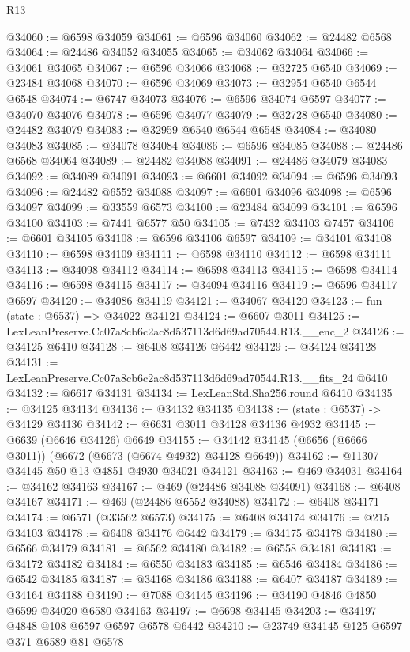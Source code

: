 \begin{lexlean}{R13}
\begin{coremodule}
@34060 := @6598 @34059
@34061 := @6596 @34060
@34062 := @24482 @6568
@34064 := @24486 @34052 @34055
@34065 := @34062 @34064
@34066 := @34061 @34065
@34067 := @6596 @34066
@34068 := @32725 @6540
@34069 := @23484 @34068
@34070 := @6596 @34069
@34073 := @32954 @6540 @6544 @6548
@34074 := @6747 @34073
@34076 := @6596 @34074 @6597
@34077 := @34070 @34076
@34078 := @6596 @34077
@34079 := @32728 @6540
@34080 := @24482 @34079
@34083 := @32959 @6540 @6544 @6548
@34084 := @34080 @34083
@34085 := @34078 @34084
@34086 := @6596 @34085
@34088 := @24486 @6568 @34064
@34089 := @24482 @34088
@34091 := @24486 @34079 @34083
@34092 := @34089 @34091
@34093 := @6601 @34092
@34094 := @6596 @34093
@34096 := @24482 @6552 @34088
@34097 := @6601 @34096
@34098 := @6596 @34097
@34099 := @33559 @6573
@34100 := @23484 @34099
@34101 := @6596 @34100
@34103 := @7441 @6577 @50
@34105 := @7432 @34103 @7457
@34106 := @6601 @34105
@34108 := @6596 @34106 @6597
@34109 := @34101 @34108
@34110 := @6598 @34109
@34111 := @6598 @34110
@34112 := @6598 @34111
@34113 := @34098 @34112
@34114 := @6598 @34113
@34115 := @6598 @34114
@34116 := @6598 @34115
@34117 := @34094 @34116
@34119 := @6596 @34117 @6597
@34120 := @34086 @34119
@34121 := @34067 @34120
@34123 := fun (state : @6537) => @34022 @34121
@34124 := @6607 @3011
@34125 := LexLeanPreserve.Cc07a8cb6c2ac8d537113d6d69ad70544.R13.__enc_2
@34126 := @34125 @6410
@34128 := @6408 @34126 @6442
@34129 := @34124 @34128
@34131 := LexLeanPreserve.Cc07a8cb6c2ac8d537113d6d69ad70544.R13.__fits_24 @6410
@34132 := @6617 @34131
@34134 := LexLeanStd.Sha256.round @6410
@34135 := @34125 @34134
@34136 := @34132 @34135
@34138 := (state : @6537) -> @34129 @34136
@34142 := @6631 @3011 @34128 @34136 @4932
@34145 := @6639 (@6646 @34126) @6649
@34155 := @34142 @34145 (@6656 (@6666 @3011)) (@6672 (@6673 (@6674 @4932) @34128 @6649))
@34162 := @11307 @34145 @50 @13 @4851 @4930 @34021 @34121
@34163 := @469 @34031
@34164 := @34162 @34163
@34167 := @469 (@24486 @34088 @34091)
@34168 := @6408 @34167
@34171 := @469 (@24486 @6552 @34088)
@34172 := @6408 @34171
@34174 := @6571 (@33562 @6573)
@34175 := @6408 @34174
@34176 := @215 @34103
@34178 := @6408 @34176 @6442
@34179 := @34175 @34178
@34180 := @6566 @34179
@34181 := @6562 @34180
@34182 := @6558 @34181
@34183 := @34172 @34182
@34184 := @6550 @34183
@34185 := @6546 @34184
@34186 := @6542 @34185
@34187 := @34168 @34186
@34188 := @6407 @34187
@34189 := @34164 @34188
@34190 := @7088 @34145
@34196 := @34190 @4846 @4850 @6599 @34020 @6580 @34163
@34197 := @6698 @34145
@34203 := @34197 @4848 @108 @6597 @6597 @6578 @6442
@34210 := @23749 @34145 @125 @6597 @371 @6589 @81 @6578

\end{coremodule}
\end{lexlean}
